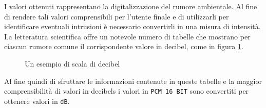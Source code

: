 I valori ottenuti rappresentano la digitalizzazione del rumore ambientale. Al fine di rendere tali valori comprensibili per l'utente finale e di utilizzarli per identificare eventuali intrusioni è necessario convertirli in una misura di intensità. La letteratura scientifica offre un notevole numero di tabelle che mostrano per ciascun rumore comune il corrispondente valore in decibel, come in figura \ref{img:decibels}. 

\begin{figure}[!ht]
\begin{center}
\caption{Un esempio di scala di decibel}
\label{img:decibels}
\end{center}
\end{figure}

Al fine quindi di sfruttare le informazioni contenute in queste tabelle e la maggior comprensibilità di valori in decibels i valori in \texttt{PCM 16 BIT} sono convertiti per ottenere valori in \texttt{dB}.\\

